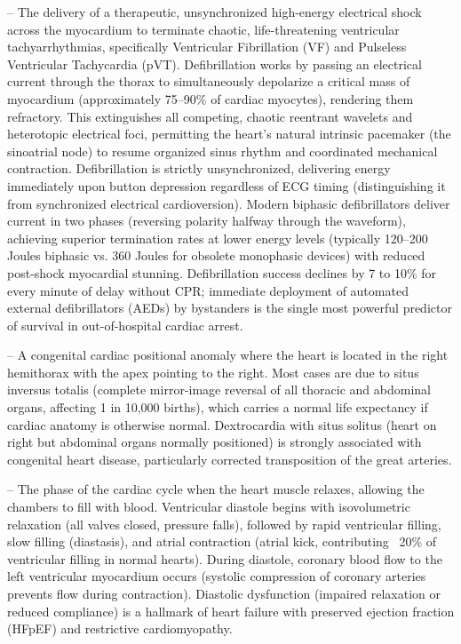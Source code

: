 -- The delivery of a therapeutic, unsynchronized high-energy electrical shock across the myocardium to terminate chaotic, life-threatening ventricular tachyarrhythmias, specifically Ventricular Fibrillation (VF) and Pulseless Ventricular Tachycardia (pVT). Defibrillation works by passing an electrical current through the thorax to simultaneously depolarize a critical mass of myocardium (approximately 75--90\% of cardiac myocytes), rendering them refractory. This extinguishes all competing, chaotic reentrant wavelets and heterotopic electrical foci, permitting the heart's natural intrinsic pacemaker (the sinoatrial node) to resume organized sinus rhythm and coordinated mechanical contraction. Defibrillation is strictly unsynchronized, delivering energy immediately upon button depression regardless of ECG timing (distinguishing it from synchronized electrical cardioversion). Modern biphasic defibrillators deliver current in two phases (reversing polarity halfway through the waveform), achieving superior termination rates at lower energy levels (typically 120--200 Joules biphasic vs. 360 Joules for obsolete monophasic devices) with reduced post-shock myocardial stunning. Defibrillation success declines by 7 to 10\% for every minute of delay without CPR; immediate deployment of automated external defibrillators (AEDs) by bystanders is the single most powerful predictor of survival in out-of-hospital cardiac arrest.

-- A congenital cardiac positional anomaly where the heart is located in the right hemithorax with the apex pointing to the right. Most cases are due to situs inversus totalis (complete mirror-image reversal of all thoracic and abdominal organs, affecting 1 in 10,000 births), which carries a normal life expectancy if cardiac anatomy is otherwise normal. Dextrocardia with situs solitus (heart on right but abdominal organs normally positioned) is strongly associated with congenital heart disease, particularly corrected transposition of the great arteries.

-- The phase of the cardiac cycle when the heart muscle relaxes, allowing the chambers to fill with blood. Ventricular diastole begins with isovolumetric relaxation (all valves closed, pressure falls), followed by rapid ventricular filling, slow filling (diastasis), and atrial contraction (atrial kick, contributing ~20\% of ventricular filling in normal hearts). During diastole, coronary blood flow to the left ventricular myocardium occurs (systolic compression of coronary arteries prevents flow during contraction). Diastolic dysfunction (impaired relaxation or reduced compliance) is a hallmark of heart failure with preserved ejection fraction (HFpEF) and restrictive cardiomyopathy.

